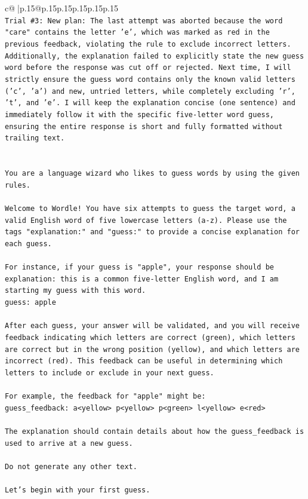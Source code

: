 \documentclass{article}
\begin{document}
{\begin{supertabular}{c@{$\;$}|p{.15\linewidth}@{}p{.15\linewidth}p{.15\linewidth}p{.15\linewidth}p{.15\linewidth}p{.15\linewidth}}
{{{\\ 
\texttt{Trial \#3: New plan: The last attempt was aborted because the word "care" contains the letter 'e', which was marked as red in the previous feedback, violating the rule to exclude incorrect letters. Additionally, the explanation failed to explicitly state the new guess word before the response was cut off or rejected. Next time, I will strictly ensure the guess word contains only the known valid letters ('c', 'a') and new, untried letters, while completely excluding 'r', 't', and 'e'. I will keep the explanation concise (one sentence) and immediately follow it with the specific five{-}letter word guess, ensuring the entire response is short and fully formatted without trailing text.} \\
\\ 
\\ 
\texttt{You are a language wizard who likes to guess words by using the given rules.} \\
\\ 
\texttt{Welcome to Wordle! You have six attempts to guess the target word, a valid English word of five lowercase letters (a{-}z). Please use the tags "explanation:" and "guess:" to provide a concise explanation for each guess.} \\
\\ 
\texttt{For instance, if your guess is "apple", your response should be} \\
\texttt{explanation: this is a common five{-}letter English word, and I am starting my guess with this word.} \\
\texttt{guess: apple} \\
\\ 
\texttt{After each guess, your answer will be validated, and you will receive feedback indicating which letters are correct (green), which letters are correct but in the wrong position (yellow), and which letters are incorrect (red). This feedback can be useful in determining which letters to include or exclude in your next guess.} \\
\\ 
\texttt{For example, the feedback for "apple" might be:} \\
\texttt{guess\_feedback: a<yellow> p<yellow> p<green> l<yellow> e<red>} \\
\\ 
\texttt{The explanation should contain details about how the guess\_feedback is used to arrive at a new guess.} \\
\\ 
\texttt{Do not generate any other text.} \\
\\ 
\texttt{Let's begin with your first guess.} \\
            }
        }
    }
     \\ \\


\end{supertabular}}
\end{document}
